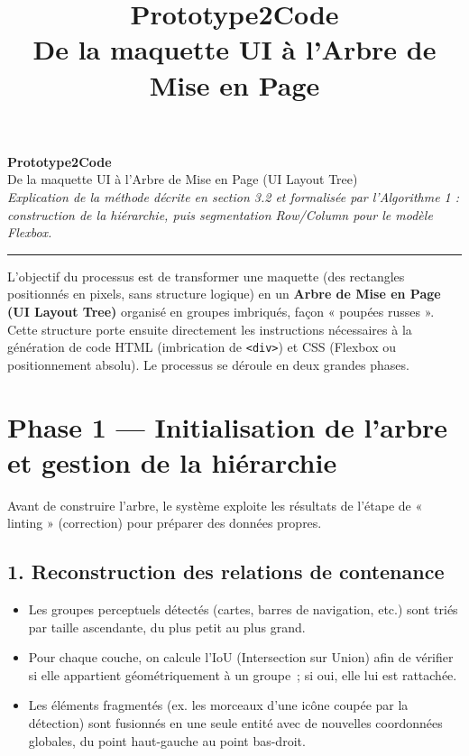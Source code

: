 \documentclass[11pt,a4paper]{article}
\title{
  \color{titlecolor}\textbf{\huge Prototype2Code}\\[4pt]
  \color{titlecolor}\Large De la maquette UI à l'Arbre de Mise en Page
}
\author{}
\date{}
\newcommand{\code}[1]{\texttt{#1}}
\begin{document}
\begin{center}
  {\huge\bfseries\color{titlecolor} Prototype2Code}\\[6pt]
  {\Large\color{h1color} De la maquette UI à l'Arbre de Mise en Page (UI Layout Tree)}\\[10pt]
  {\color{graytext}\itshape Explication de la méthode décrite en section 3.2 et formalisée par l'Algorithme 1 :\\
  construction de la hiérarchie, puis segmentation Row/Column pour le modèle Flexbox.}
\end{center}

\vspace{4pt}
\noindent\rule{\textwidth}{0.6pt}
\vspace{10pt}

L'objectif du processus est de transformer une maquette (des rectangles positionnés en pixels, sans structure logique) en un \textbf{Arbre de Mise en Page (UI Layout Tree)} organisé en groupes imbriqués, façon « poupées russes ». Cette structure porte ensuite directement les instructions nécessaires à la génération de code HTML (imbrication de \code{<div>}) et CSS (Flexbox ou positionnement absolu). Le processus se déroule en deux grandes phases.

\section*{Phase 1 --- Initialisation de l'arbre et gestion de la hiérarchie}

Avant de construire l'arbre, le système exploite les résultats de l'étape de « linting » (correction) pour préparer des données propres.

\subsection*{1. Reconstruction des relations de contenance}
\begin{itemize}[leftmargin=1.2em, itemsep=4pt]
  \item Les groupes perceptuels détectés (cartes, barres de navigation, etc.) sont triés par taille ascendante, du plus petit au plus grand.
  \item Pour chaque couche, on calcule l'IoU (Intersection sur Union) afin de vérifier si elle appartient géométriquement à un groupe~; si oui, elle lui est rattachée.
  \item Les éléments fragmentés (ex. les morceaux d'une icône coupée par la détection) sont fusionnés en une seule entité avec de nouvelles coordonnées globales, du point haut-gauche au point bas-droit.
\end{itemize}
\end{document}
